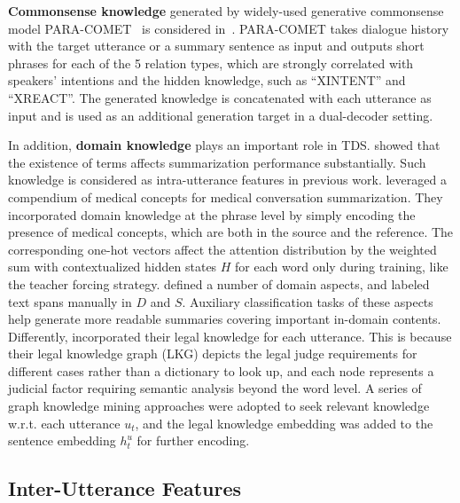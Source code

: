 \textbf{Commonsense knowledge} generated by widely-used generative commonsense model PARA-COMET~\cite{gabriel2021paragraph} is considered in~\cite{kim2022mind}. PARA-COMET takes dialogue history with the target utterance or a summary sentence as input and outputs short phrases for each of the 5 relation types, which are strongly correlated with speakers' intentions and the hidden knowledge, such as ``XINTENT'' and ``XREACT''. The generated knowledge is concatenated with each utterance as input and is used as an additional generation target in a dual-decoder setting.

In addition, \textbf{domain knowledge} plays an important role in TDS. 
\citet{koay2020meet} showed that the existence of 
terms affects summarization performance substantially. 
Such knowledge is considered as intra-utterance features in previous work.
\citet{joshi2020dr} leveraged a compendium of medical concepts for 
medical conversation summarization. They incorporated domain knowledge at 
the phrase level by simply encoding the presence of medical concepts, which 
are both in the source and the reference. The corresponding one-hot vectors 
affect the attention distribution by the weighted sum with contextualized 
hidden states $H$ for each word only during training, like the teacher forcing strategy.
\citet{gan2021inspectional} defined a number of domain aspects, and labeled text spans manually in $D$ and $S$. Auxiliary classification tasks of these aspects help generate more readable summaries covering important in-domain contents. 
Differently, \citet{duan2019legal} incorporated their legal 
knowledge for each utterance. This is because their legal knowledge graph 
(LKG) depicts the legal judge requirements for different cases rather than a dictionary to look up, and each node represents a judicial factor 
requiring semantic analysis beyond the word level. A series of graph 
knowledge mining approaches were adopted to seek relevant knowledge w.r.t. 
each utterance $u_t$, and the legal knowledge embedding was added 
to the sentence embedding $h_t^u$ for further encoding.
 

\subsection{Inter-Utterance Features}\label{sec:interutt}

